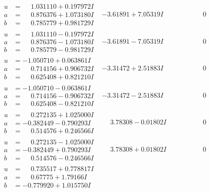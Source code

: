 \documentclass[1p]{elsarticle_modified}
\theoremstyle{definition}
\begin{document}
$$\begin{array}{c|c|c}
\begin{aligned}
u &= \phantom{-}1.031110 + 0.197972 I \\
a &= \phantom{-}0.876376 + 1.073180 I \\
b &= \phantom{-}0.785779 + 0.981729 I\end{aligned}
 & -3.61891 + 7.05319 I & \phantom{-0.000000 } 0 \\ \hline\begin{aligned}
u &= \phantom{-}1.031110 - 0.197972 I \\
a &= \phantom{-}0.876376 - 1.073180 I \\
b &= \phantom{-}0.785779 - 0.981729 I\end{aligned}
 & -3.61891 - 7.05319 I & \phantom{-0.000000 } 0 \\ \hline\begin{aligned}
u &= -1.050710 + 0.063861 I \\
a &= \phantom{-}0.714156 + 0.906732 I \\
b &= \phantom{-}0.625408 + 0.821210 I\end{aligned}
 & -3.31472 + 2.51883 I & \phantom{-0.000000 } 0 \\ \hline\begin{aligned}
u &= -1.050710 - 0.063861 I \\
a &= \phantom{-}0.714156 - 0.906732 I \\
b &= \phantom{-}0.625408 - 0.821210 I\end{aligned}
 & -3.31472 - 2.51883 I & \phantom{-0.000000 } 0 \\ \hline\begin{aligned}
u &= \phantom{-}0.272135 + 1.025000 I \\
a &= -0.382449 - 0.790293 I \\
b &= \phantom{-}0.514576 + 0.246566 I\end{aligned}
 & \phantom{-}3.78308 - 0.01802 I & \phantom{-0.000000 } 0 \\ \hline\begin{aligned}
u &= \phantom{-}0.272135 - 1.025000 I \\
a &= -0.382449 + 0.790293 I \\
b &= \phantom{-}0.514576 - 0.246566 I\end{aligned}
 & \phantom{-}3.78308 + 0.01802 I & \phantom{-0.000000 } 0 \\ \hline\begin{aligned}
u &= \phantom{-}0.735517 + 0.778817 I \\
a &= \phantom{-}0.67775 + 1.79166 I \\
b &= -0.779920 + 1.015750 I\end{aligned}

\end{array}$$
\end{document}
